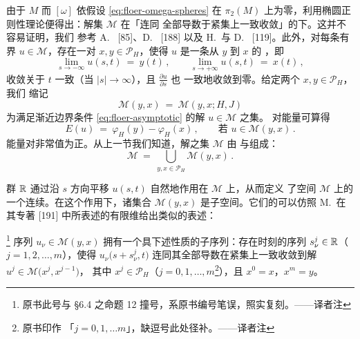 由于 $M$ \trCompact{}而 $[\omega]$ 依假设 \eqref{eq:floer-omega-spheres} 在%
$\pi_{2}(M)$ 上为零，利用椭圆正则性理论便得出：解集 $\mathcal{M}$ 在「连同%
全部导数于紧集上一致收敛」的\trTopology{}下\trCompact。这并不容易证明，我们%
参考 A.~\trFloer{} [85]、D.~\trSalamon{} [188] 以及 H.~\trHofer{}与%
D.~\trSalamon{} [119]。此外，对每条有界\trOrbit{} $u\in\mathcal{M}$，存在一对%
\trPeriodicSolution{} $x,y\in\mathcal{P}_{H}$，使得 $u$ 是一条从 $y$ 到 $x$ 的%
\trConnectingOrbit，即
\begin{equation}\label{eq:floer-asymptotic}
\lim_{s\to-\infty}u(s,t)\ =\ y(t)\,,\qquad \lim_{s\to+\infty}u(s,t)\ =\ x(t)\,,
\end{equation}
收敛关于 $t$ 一致（当 $|s|\to\infty$），且 $\frac{\partial u}{\partial s}$ 也%
一致地收敛到零。给定两个\trPeriodicSolution{} $x,y\in\mathcal{P}_{H}$，我们%
缩记
\begin{equation}\label{eq:floer-myx}
\mathcal{M}(y,x)\ =\ \mathcal{M}(y,x;H,J)
\end{equation}
为满足渐近边界条件 \eqref{eq:floer-asymptotic} 的解 $u\in\mathcal{M}$ 之集。%
对能量可算得
\begin{equation}\label{eq:floer-energy-myx}
E(u)\ =\ \varphi_{H}(y)-\varphi_{H}(x)\,,\qquad\text{若 }u\in\mathcal{M}(y,x)\,.
\end{equation}
能量对非常值\trOrbit{}为正。从上一节我们知道，解之集 $\mathcal{M}$ 由%
\trPeriodicSolution{}与\trConnectingOrbit{}组成：
\begin{equation}\label{eq:floer-m-union}
\mathcal{M}\ =\ \bigcup_{y,x\in\mathcal{P}_{H}}\mathcal{M}(y,x)\,.
\end{equation}

群 $\mathbb{R}$ 通过沿 $s$ 方向平移 $u(s,t)$ 自然地作用在 $\mathcal{M}$ 上，从而定义%
了空间 $\mathcal{M}$ 上的一个连续\trFlow。在这个作用下，诸集合%
$\mathcal{M}(y,x)$ 是\trInvariant{}子空间。它们的\trCompactness{}可以仿照%
M.~\trSchwarz{}在其专著 [191] 中所表述的有限维\trMorseTheory{}给出类似的表述：

\begin{proposition}\label{prop:broken-orbit-compactness}
\footnote{原书此号与 §6.4 之命题 12 撞号，系原书编号笔误，照实复刻。——译者注}
序列 $u_{\nu}\in\mathcal{M}(y,x)$ 拥有一个具下述性质的子序列：存在时刻的序列%
$s_{\nu}^{j}\in\mathbb{R}$（$j=1,2,\ldots,m$），使得 $u_{\nu}\bigl(s+s_{\nu}^{j},t\bigr)$%
连同其全部导数在紧集上一致收敛到解 $u^{j}\in\mathcal{M}\bigl(x^{j},x^{j-1}\bigr)$，%
其中 $x^{j}\in\mathcal{P}_{H}$（$j=0,1,\ldots,m$\footnote{原书印作%
「$j=0,1,\ldots m$」，缺逗号此处径补。——译者注}），且 $x^{0}=x$，$x^{m}=y$。
\end{proposition}

